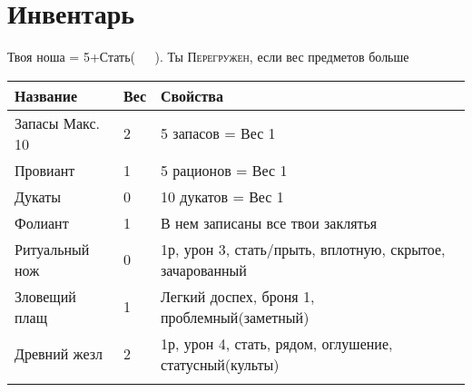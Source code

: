 \section*{Инвентарь}

Твоя ноша = 5+Стать(\verb!   !). Ты {\scshape Перегружен}, если вес
предметов больше
\begin{center}
  {\footnotesize
\begin{tabular}{|p{2cm}|p{0.5cm}|p{4.5cm}|}
  \hline
  Название & Вес & Свойства \\ \hline
  Запасы {\tiny Макс. 10} & 2 & 5 запасов = Вес 1 \\
  Провиант & 1 & 5 рационов = Вес 1 \\
  Дукаты & 0 & 10 дукатов = Вес 1 \\ \hline
  Фолиант & 1 & В нем записаны все твои заклятья \\
  Ритуальный нож & 0 & 1р, урон 3, стать/прыть, вплотную, скрытое, зачарованный \\
  Зловещий плащ & 1 & Легкий доспех, броня 1, проблемный(заметный) \\
  Древний жезл & 2 & 1р, урон 4, стать, рядом, оглушение, статусный(культы) \\
   & & \\ [45ex]
   \hline  
\end{tabular}
}
\end{center}
\pagebreak
